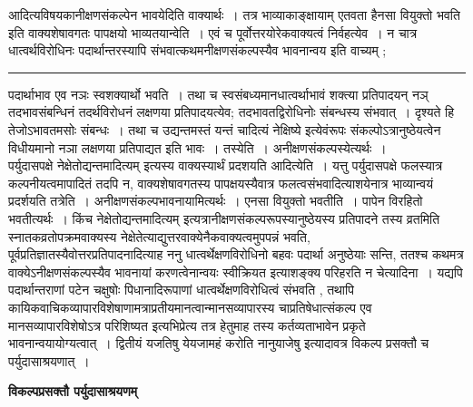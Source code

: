 \documentclass[11pt, openany]{book}
\begin{document}
{\bl आदित्यविषयकानीक्षणसंकल्पेन भावयेदिति वाक्यार्थः~। तत्र भाव्याकाङ्क्षायाम् {\qtl एतवता हैनसा वियुक्तो भवति}  इति वाक्यशेषावगतः पापक्षयो भाव्यतयान्वेति~। एवं च पूर्वोत्तरयोरेकवाक्यत्वं निर्वहत्येव~। न चात्र धात्वर्थविरोधिनः पदार्थान्तरस्यापि संभवात्कथमनीक्षणसंकल्पस्यैव भावनान्वय इति वाच्यम् ; }\\
\hrule
\vspace{3mm}
\noindent
पदार्थाभाव एव नञः स्वशक्यार्थो भवति~। तथा च स्वसंबध्यमानधात्वर्थाभावं शक्त्या प्रतिपादयन् नञ् तदभावसंबन्धिनं तदर्थविरोधनं लक्षणया प्रतिपादयत्येव; तदभावतद्विरोधिनोः संबन्धस्य संभवात्~। दृश्यते हि तेजोऽभावतमसोः संबन्धः~। तथा च {\qt उद्यन्तमस्तं यन्तं चादित्यं नेक्षिष्ये}  इत्येवंरूपः संकल्पोऽत्रानुष्ठेयत्वेन विधीयमानो नञा लक्षणया प्रतिपाद्यत इति भावः~। {\br तस्येति~।} अनीक्षणसंकल्पस्येत्यर्थः~।~\\

 पर्युदासपक्षे {\qt नेक्षेतोद्यन्तमादित्यम्} इत्यस्य वाक्यस्यार्थं प्रदशयति {\br आदित्येति~।} यत्तु पर्युदासपक्षे फलस्यात्र कल्पनीयत्वमापादितं तदपि न, वाक्यशेषावगतस्य पापक्षयस्यैवात्र फलत्वसंभवादित्याशयेनात्र भाव्यान्वयं प्रदर्शयति {\br तत्रेति~।} अनीक्षणसंकल्पभावनायामित्यर्थः~। {\br एनसा वियुक्तो भवतीति~।} पापेन विरहितो भवतीत्यर्थः~। किंच {\qt नेक्षेतोद्यन्तमादित्यम्} इत्यत्रानीक्षणसंकल्परूपस्यानुष्ठेयस्य प्रतिपादने तस्य व्रतमिति स्नातकव्रतोपक्रमवाक्यस्य नेक्षेतेत्याद्युत्तरवाक्येनैकवाक्यत्वमुपपन्नं भवति, पूर्वप्रतिज्ञातस्यैवोत्तरप्रतिपादनादित्याह {\br ननु} धात्वर्थेक्षणविरोधिनो बहवः पदार्था
अनुष्ठेयाः सन्ति, ततश्च कथमत्र वाक्येऽनीक्षणसंकल्पस्यैव भावनायां करणत्वेनान्वयः  स्वीक्रियत इत्याशङ्क्य परिहरति {\br न चेत्यादिना~।} यद्यपि पदार्थान्तराणां 
पटेन चक्षुषोः पिधानादिरूपाणां धात्वर्थेक्षणविरोधित्वं संभवति , तथापि  कायिकवाचिकव्यापारविशेषाणामत्राप्रतीयमानत्वान्मानसव्यापारस्य चाप्रतिषेधात्संकल्प एव मानसव्यापारविशेषोऽत्र परिशिष्यत इत्यभिप्रेत्य तत्र हेतुमाह\textendash
\newpage
\fancyhead[LO]{[ वि० पर्युदासाश्रयणम् ]}
{\bl\noindent तस्य कर्तव्यताभावेन प्रकृते भावनान्वयायोग्यत्वात्~। द्वितीयं {\qtl यजतिषु येयजामहं करोति नानुयाजेषु}  इत्यादावत्र विकल्प प्रसक्तौ च पर्युदासाश्रयणात्~।}
\begin{center}
 \textbf{विकल्पप्रसक्तौ पर्युदासाश्रयणम्} 
\end{center}
 
\end{document}
